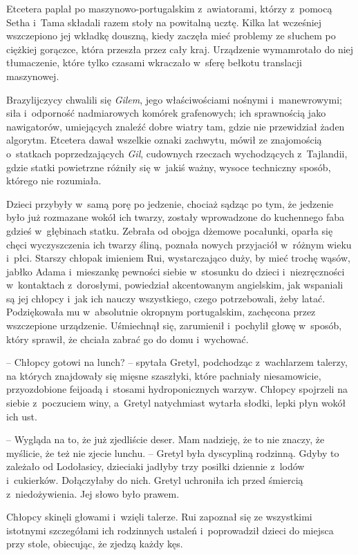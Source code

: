 \documentclass[oneside,polish,11pt,sfheadings]{mwbk}
\begin{document}
Etcetera paplał po maszynowo-portugalskim z~awiatorami, którzy z~pomocą
Setha i~Tama składali razem stoły na powitalną ucztę. Kilka lat
wcześniej wszczepiono jej wkładkę douszną, kiedy zaczęła mieć problemy
ze słuchem po ciężkiej gorączce, która przeszła przez cały kraj.
Urządzenie wymamrotało do niej tłumaczenie, które tylko czasami
wkraczało w~sferę bełkotu translacji maszynowej.

Brazylijczycy chwalili się \textit{Gilem}, jego właściwościami nośnymi i~manewrowymi; siła i~odporność nadmiarowych komórek grafenowych; ich
sprawnością jako nawigatorów, umiejących znaleźć dobre wiatry tam, gdzie
nie przewidział żaden algorytm. Etcetera dawał wszelkie oznaki zachwytu,
mówił ze znajomością o~statkach poprzedzających \textit{Gil}, cudownych
rzeczach wychodzących z~Tajlandii, gdzie statki powietrzne różniły się w~jakiś ważny, wysoce techniczny sposób, którego nie rozumiała.

Dzieci przybyły w~samą porę po jedzenie, chociaż sądząc po tym, że
jedzenie było już rozmazane wokół ich twarzy, zostały wprowadzone do
kuchennego faba gdzieś w~głębinach statku. Zebrała od obojga dżemowe
pocałunki, oparła się chęci wyczyszczenia ich twarzy śliną, poznała
nowych przyjaciół w~różnym wieku i~płci. Starszy chłopak imieniem Rui,
wystarczająco duży, by mieć trochę wąsów, jabłko Adama i~mieszankę
pewności siebie w~stosunku do dzieci i~niezręczności w~kontaktach z~dorosłymi, powiedział akcentowanym angielskim, jak wspaniali są jej
chłopcy i~jak ich nauczy wszystkiego, czego potrzebowali, żeby latać.
Podziękowała mu w~absolutnie okropnym portugalskim, zachęcona przez
wszczepione urządzenie. Uśmiechnął się, zarumienił i~pochylił głowę w~sposób, który sprawił, że chciała zabrać go do domu i~wychować.

-- Chłopcy gotowi na lunch? -- spytała Gretyl, podchodząc z~wachlarzem
talerzy, na których znajdowały się mięsne szaszłyki, które pachniały
niesamowicie, przyozdobione feijoadą i~stosami hydroponicznych warzyw.
Chłopcy spojrzeli na siebie z~poczuciem winy, a~Gretyl natychmiast
wytarła słodki, lepki płyn wokół ich ust.

-- Wygląda na to, że już zjedliście deser. Mam nadzieję, że to nie
znaczy, że myślicie, że też nie zjecie lunchu. -- Gretyl była dyscypliną
rodzinną. Gdyby to zależało od Lodołasicy, dzieciaki jadłyby trzy
posiłki dziennie z~lodów i~cukierków. Dołączyłaby do nich. Gretyl
uchroniła ich przed śmiercią z~niedożywienia. Jej słowo było prawem.

Chłopcy skinęli głowami i~wzięli talerze. Rui zapoznał się ze wszystkimi
istotnymi szczegółami ich rodzinnych ustaleń i~poprowadził dzieci do
miejsca przy stole, obiecując, że zjedzą każdy kęs.
\end{document}
